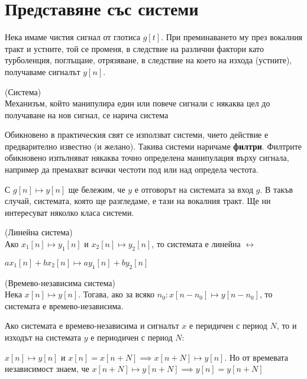 \documentclass[main.tex]{subfiles}
\begin{document}
\section{Представяне със системи}
Нека имаме чистия сигнал от глотиса $g[t]$. При преминаването му през вокалния тракт и устните, той
се променя, в следствие на различни фактори като турболенция, поглъщане, отрязяване, в следствие на което 
на изхода (устните), получаваме сигналът $y[n]$.

\begin{definition*}{(Система)}\\
Механизъм, който манипулира един или повече сигнали с някаква цел до
получаване на нов сигнал, се нарича система

Обикновено в практическия свят се използват системи, чието действие е предварително известно (и желано). Такива системи
наричаме \textbf{филтри}. Филтрите обикновено изпълняват някаква точно определена манипулация върху сигнала, например
да премахват всички честоти под или над определа честота.
\end{definition*}

С $g[n] \mapsto y[n]$ ще бележим, че $y$ е отговорът на системата за вход $g$. В такъв случай, системата, която ще разгледаме, е тази на вокалния тракт. Ще ни интересуват
няколко класа системи.

\begin{definition*}{(Линейна система)}\\
    Ако $x_1[n] \mapsto y_1[n]$ и $x_2[n] \mapsto y_2[n]$, то системата е линейна $\longleftrightarrow$

    $ax_1[n] + bx_2[n] \mapsto ay_1[n] + by_2[n]$ 
\end{definition*}


\begin{definition*}{(Времево-независима система)}\\
    Нека $x[n] \mapsto y[n]$. Тогава, ако за всяко $n_0: x[n - n_0] \mapsto y[n - n_0]$, то
    системата е времево-независима.
\end{definition*}

\begin{property}
\label{systems:periodicity}
Ако системата е времево-независима и сигналът $x$ е перидичен с период $N$,
то и изходът на системата $y$ е периодичен с период $N$:

$x[n] \mapsto y[n]$ и $x[n] = x[n+N] \implies x[n+N] \mapsto y[n]$. Но от времевата независимост знаем, че
$x[n+N] \mapsto y[n+N] \implies y[n] = y[n+N]$
\end{property}
\end{document}
